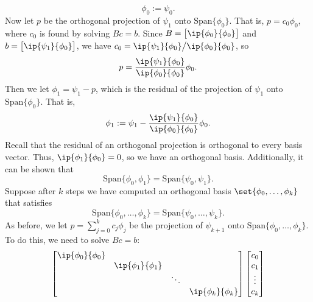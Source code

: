 \documentclass{report}
\begin{document}
\begin{itemize}
            $$\phi_0 := \psi_0.$$
            Now let $p$ be the orthogonal projection of $\psi_1$ onto $\text{Span}\{\phi_0\}$.
            \bigbreak \noindent 
            That is, $p = c_0 \phi_0$, where $c_0$ is found by solving $Bc = b$.
            \bigbreak \noindent 
            Since $B = \begin{bmatrix} \ip{\phi_0}{\phi_0} \end{bmatrix}$ and $b = \begin{bmatrix} \ip{\psi_1}{\phi_0} \end{bmatrix}$, we have $c_0 = \ip{\psi_1}{\phi_0} \big/ \ip{\phi_0}{\phi_0}$, so
            \bigbreak \noindent 
            $$p = \frac{\ip{\psi_1}{\phi_0}}{\ip{\phi_0}{\phi_0}} \phi_0.$$
            \bigbreak \noindent 
            Then we let $\phi_1 = \psi_1 - p$, which is the residual of the projection of $\psi_1$ onto $\text{Span}\{\phi_0\}$.
            \bigbreak \noindent 
            That is,
            $$\phi_1 := \psi_1 - \frac{\ip{\psi_1}{\phi_0}}{\ip{\phi_0}{\phi_0}} \phi_0.$$
            Recall that the residual of an orthogonal projection is orthogonal to every basis vector.
            \bigbreak \noindent 
            Thus, $\ip{\phi_1}{\phi_0} = 0$, so we have an orthogonal basis. 
            \bigbreak \noindent 
            Additionally, it can be shown that
            \bigbreak \noindent 
            $$\text{Span}\{\phi_0,\phi_1\} = \text{Span}\{\psi_0,\psi_1\}.$$
            \bigbreak \noindent 
            Suppose after $k$ steps we have computed an orthogonal basis $\set{\phi_0,\ldots,\phi_k}$ that satisfies
            $$\text{Span}\{\phi_0,\ldots,\phi_k\} = \text{Span}\{\psi_0,\ldots,\psi_k\}.$$
            As before, we let $p = \sum_{j=0}^k c_j \phi_j$ be the projection of $\psi_{k+1}$ onto $\text{Span}\{\phi_0,\ldots,\phi_k\}$.
            \bigbreak \noindent 
            To do this, we need to solve $Bc = b$:
            $$
            \begin{bmatrix}
                \ip{\phi_0}{\phi_0}\\
&\ip{\phi_1}{\phi_1}\\
&&\ddots\\
&&&\ip{\phi_k}{\phi_k}\\
            \end{bmatrix}
            \begin{bmatrix}
                c_0\\
                c_1\\
                \vdots\\
                c_k\\

\end{bmatrix}$$
\end{itemize}
\end{document}
